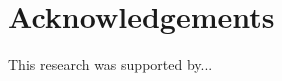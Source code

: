 \documentclass[10pt,letterpaper]{article}
\begin{document}
\section{Acknowledgements}

This research was supported by... 

\renewcommand{\bibliographytypesize}{\footnotesize}


\setlength{\bibleftmargin}{.125in}
\setlength{\bibindent}{-\bibleftmargin}



\end{document}
